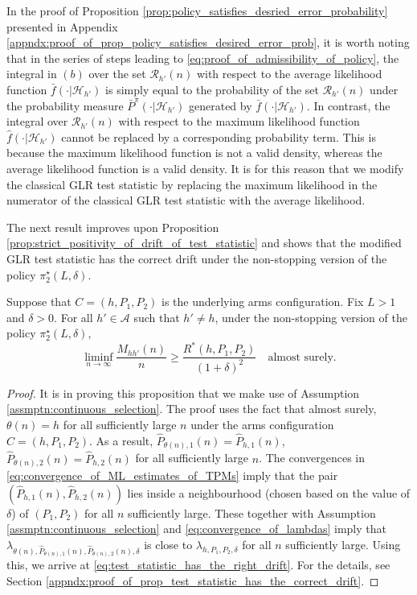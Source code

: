 {\color{black} \begin{remark}
In the proof of Proposition \ref{prop:policy_satisfies_desried_error_probability} presented in Appendix \ref{appndx:proof_of_prop_policy_satisfies_desired_error_prob}, it is worth noting that in the series of steps leading to \eqref{eq:proof_of_admissibility_of_policy}, the integral in $(b)$ over the set $\mathcal{R}_{h'}(n)$ with respect to the average likelihood function $\bar{f}(\cdot|\mathcal{H}_{h'})$ is simply equal to the probability of the set $\mathcal{R}_{h'}(n)$ under the probability measure $\bar{P}^{\pi}(\cdot|\mathcal{H}_{h'})$ generated by $\bar{f}(\cdot|\mathcal{H}_{h'})$. In contrast, the integral over $\mathcal{R}_{h'}(n)$ with respect to the maximum likelihood function $\hat{f}(\cdot|\mathcal{H}_{h'})$ cannot be replaced by a corresponding probability term. This is because the maximum likelihood function is not a valid density, whereas the average likelihood function is a valid density. It is for this reason that we modify the classical GLR test statistic by replacing the maximum likelihood in the numerator of the classical GLR test statistic with the average likelihood.
\end{remark}}

The next result improves upon Proposition \ref{prop:strict_positivity_of_drift_of_test_statistic} and shows that the modified GLR test statistic has the correct drift under the non-stopping version of the policy $\pi_2^\star(L, \delta)$.
\begin{prop}
	\label{prop:test_statistic_has_the_correct_drift}
	Suppose that $C=(h, P_1, P_2)$ is the underlying arms configuration. Fix $L> 1$ and $\delta>0$. For all $h'\in \mathcal{A}$ such that $h'\neq h$, under the non-stopping version of the policy $\pi_2^\star(L, \delta)$,
	\begin{equation}
		\liminf\limits_{n \to \infty} \frac{M_{hh'}(n)}{n}\geq \frac{R^*(h, P_1, P_2)}{(1+\delta)^2}\quad \text{almost surely}.
		\label{eq:test_statistic_has_the_right_drift}
	\end{equation}
\end{prop}
\begin{proof}
It is in proving this proposition that we make use of Assumption \ref{assmptn:continuous_selection}. The proof uses the fact that almost surely, $\theta(n)=h$ for all sufficiently large $n$ under the arms configuration $C=(h, P_1, P_2)$. As a result, $\hat{P}_{\theta(n),1}(n)=\hat{P}_{h,1}(n)$, $\hat{P}_{\theta(n),2}(n)=\hat{P}_{h,2}(n)$ for all sufficiently large $n$. The convergences in \eqref{eq:convergence_of_ML_estimates_of_TPMs} imply that the pair $(\hat{P}_{h,1}(n),\hat{P}_{h,2}(n))$ lies inside a neighbourhood (chosen based on the value of $\delta$) of $(P_1, P_2)$ for all $n$ sufficiently large. These together with Assumption \ref{assmptn:continuous_selection} and \eqref{eq:convergence_of_lambdas} imply that $\lambda_{\theta(n), \hat{P}_{\theta(n),1}(n), \hat{P}_{\theta(n),2}(n), \delta}$ is close to $\lambda_{h, P_1, P_2, \delta}$ for all $n$ sufficiently large. Using this, we arrive at \eqref{eq:test_statistic_has_the_right_drift}. For the details, see Section \ref{appndx:proof_of_prop_test_statistic_has_the_correct_drift}.
\end{proof}

